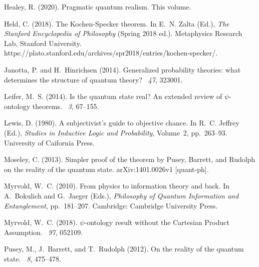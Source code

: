 \documentclass[12pt]{article}
\begin{document}
\begin{thebibliography}{50}
Healey, R. (2020).
\newblock Pragmatic quantum realism.
\newblock This volume.

Held, C. (2018).
\newblock The {K}ochen-{S}pecker theorem.
\newblock In E.~N. Zalta (Ed.), {\em The Stanford Encyclopedia of Philosophy\/}
  (Spring 2018 ed.). Metaphysics Research Lab, Stanford University.
\newblock https://plato.stanford.edu/archives/spr2018/entries/kochen-specker/.

Janotta, P. and H.~Hinrichsen (2014).
\newblock Generalized probability theories: what determines the structure of
  quantum theory?
~{\em 47},
  323001.

Leifer, M.~S. (2014).
\newblock Is the quantum state real? {A}n extended review of $\psi$-ontology
  theorems.
~{\em 3}, 67--155.

Lewis, D. (1980).
\newblock A subjectivist's guide to objective chance.
\newblock In R.~C. Jeffrey (Ed.), {\em Studies in Inductive Logic and
  Probability}, Volume~2, pp.\  263--93. University of Caifornia Press.

Moseley, C. (2013).
\newblock Simpler proof of the theorem by {P}usey, {B}arrett, and {R}udolph on
  the reality of the quantum state.
\newblock arXiv:1401.0026v1 [quant-ph].

Myrvold, W.~C. (2010).
\newblock From physics to information theory and back.
\newblock In A.~Bokulich and G.~Jaeger (Eds.), {\em Philosophy of Quantum
  Information and Entanglement}, pp.\  181--207. Cambridge: Cambridge
  University Press.

Myrvold, W.~C. (2018).
\newblock $\psi$-ontology result without the {C}artesian {P}roduct
  {A}ssumption.
~{\em 97}, 052109.

Pusey, M., J.~Barrett, and T.~Rudolph (2012).
\newblock On the reality of the quantum state.
~{\em 8}, 475--478.


\end{thebibliography}
\end{document}
